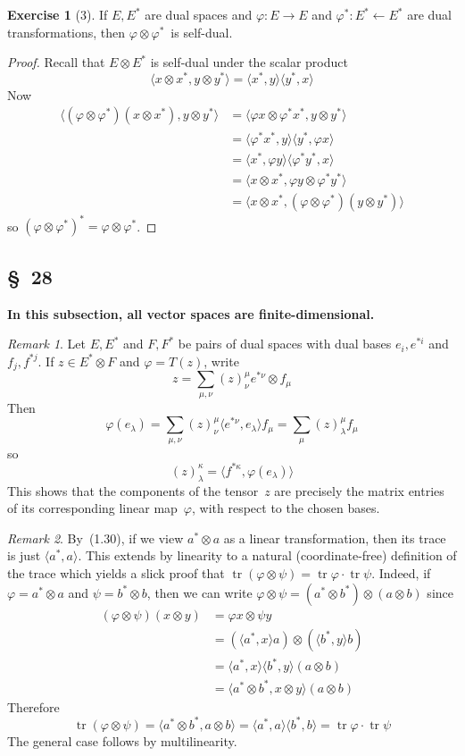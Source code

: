 \documentclass[letterpaper,12pt]{article}
\newcommand{\from}{\leftarrow}
\DeclareMathOperator{\tr}{tr}
\newcommand{\mult}{\cdot}
\newcommand{\tprod}{\otimes}
\newcommand{\sprod}[2]{\langle#1,#2\rangle}
\theoremstyle{definition}
\newtheorem*{exer}{Exercise}
\theoremstyle{remark}
\newtheorem*{rmk}{Remark}
\begin{document}
\begin{exer}[3]
If \(E,E^*\) are dual spaces and \(\varphi:E\to E\) and \(\varphi^*:E^*\from E^*\) are dual transformations, then \(\varphi\tprod\varphi^*\)~is self-dual.
\end{exer}
\begin{proof}
Recall that \(E\tprod E^*\) is self-dual under the scalar product
\[\sprod{x\tprod x^*}{y\tprod y^*}=\sprod{x^*}{y}\sprod{y^*}{x}\]
Now
\begin{align*}
\sprod{(\varphi\tprod\varphi^*)(x\tprod x^*)}{y\tprod y^*}&=\sprod{\varphi x\tprod\varphi^* x^*}{y\tprod y^*}\\
	&=\sprod{\varphi^* x^*}{y}\sprod{y^*}{\varphi x}\\
	&=\sprod{x^*}{\varphi y}\sprod{\varphi^* y^*}{x}\\
	&=\sprod{x\tprod x^*}{\varphi y\tprod\varphi^* y^*}\\
	&=\sprod{x\tprod x^*}{(\varphi\tprod\varphi^*)(y\tprod y^*)}
\end{align*}
so \((\varphi\tprod\varphi^*)^*=\varphi\tprod\varphi^*\).
\end{proof}

\subsection*{\S~28}
\textbf{In this subsection, all vector spaces are finite-dimensional.}

\begin{rmk}
Let \(E,E^*\) and \(F,F^*\) be pairs of dual spaces with dual bases \(e_i,e^{*i}\) and \(f_j,f^{*j}\). If \(z\in E^*\tprod F\) and \(\varphi=T(z)\), write
\[z=\sum_{\mu,\nu}(z)^{\mu}_{\nu}e^{*\nu}\tprod f_{\mu}\]
Then
\[\varphi(e_{\lambda})=\sum_{\mu,\nu}(z)^{\mu}_{\nu}\sprod{e^{*\nu}}{e_{\lambda}}f_{\mu}=\sum_{\mu}(z)^{\mu}_{\lambda}f_{\mu}\]
so
\[(z)^{\kappa}_{\lambda}=\sprod{f^{*\kappa}}{\varphi(e_{\lambda})}\]
This shows that the components of the tensor~\(z\) are precisely the matrix entries of its corresponding linear map~\(\varphi\), with respect to the chosen bases.
\end{rmk}

\begin{rmk}
By~(1.30), if we view \(a^*\tprod a\) as a linear transformation, then its trace is just \(\sprod{a^*}{a}\). This extends by linearity to a natural (coordinate-free) definition of the trace which yields a slick proof that \(\tr(\varphi\tprod\psi)=\tr\varphi\mult\tr\psi\). Indeed, if \(\varphi=a^*\tprod a\) and \(\psi=b^*\tprod b\), then we can write \(\varphi\tprod\psi=(a^*\tprod b^*)\tprod(a\tprod b)\) since
\begin{align*}
(\varphi\tprod\psi)(x\tprod y)&=\varphi x\tprod\psi y\\
	&=(\sprod{a^*}{x}a)\tprod(\sprod{b^*}{y}b)\\
	&=\sprod{a^*}{x}\sprod{b^*}{y}(a\tprod b)\\
	&=\sprod{a^*\tprod b^*}{x\tprod y}(a\tprod b)
\end{align*}
Therefore
\[\tr(\varphi\tprod\psi)=\sprod{a^*\tprod b^*}{a\tprod b}=\sprod{a^*}{a}\sprod{b^*}{b}=\tr\varphi\mult\tr\psi\]
The general case follows by multilinearity.
\end{rmk}
\end{document}
